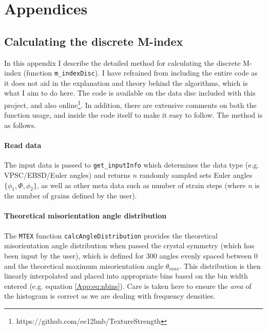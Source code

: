 \documentclass[a4paper,12pt,twoside]{report}
\numberwithin{equation}{chapter}
\begin{document}
\chapter{Appendices}

\section{Calculating the discrete M-index} \label{App:M-index_calc}
In this appendix I describe the detailed method for calculating the discrete M-index (function \texttt{m\_indexDisc}). I have refrained from including the entire code as it does not aid in the explanation and theory behind the algorithms, which is what I aim to do here. The code is available on the data disc included with this project, and also online\footnote{https://github.com/ee12lmb/TextureStrength}. In addition, there are extensive comments on both the function usage, and inside the code itself to make it easy to follow. The method is as follows. 

\subsubsection{Read data}
The input data is passed to \texttt{get\_inputInfo} which determines the data type (e.g. VPSC/EBSD/Euler angles) and returns $n$ randomly sampled sets Euler angles $\{\phi_1,\Phi,\phi_2\}$, as well as other meta data such as number of strain steps (where $n$ is the number of grains defined by the user).



\subsubsection{Theoretical misorientation angle distribution}
The \texttt{MTEX} function \texttt{calcAngleDistribution} provides the theoretical misorientation angle distribution when passed the crystal symmetry (which has been input by the user), which is defined for 300 angles evenly spaced between 0 and the theoretical maximum misorientation angle $\theta_{max}$. This distribution is then linearly interpolated and placed into appropriate bins based on the bin width entered (e.g. equation \ref{App:eq:nbins}). Care is taken here to ensure the \emph{area} of the histogram is correct as we are dealing with frequency densities.
\end{document}
